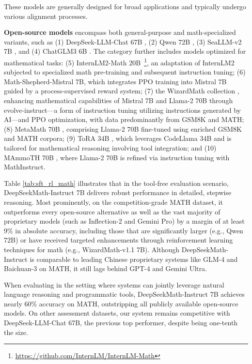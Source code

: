These models are generally designed for broad applications and typically undergo various alignment processes.
\item \textbf{Open-source models} encompass both general-purpose and math-specialized variants, such as (1) DeepSeek-LLM-Chat 67B \citep{deepseek-llm}, (2) Qwen 72B \citep{qwen}, (3) SeaLLM-v2 7B \citep{seallm}, and (4) ChatGLM3 6B \citep{chatglm3}. The category further includes models optimized for mathematical tasks: (5) InternLM2-Math 20B~\footnote{\url{https://github.com/InternLM/InternLM-Math}}, an adaptation of InternLM2 subjected to specialized math pre-training and subsequent instruction tuning; (6) Math-Shepherd-Mistral 7B, which integrates PPO training \citep{schulman2017proximal} into Mistral 7B \citep{mistral} guided by a process-supervised reward system; (7) the WizardMath collection \citep{wizardmath}, enhancing mathematical capabilities of Mistral 7B and Llama-2 70B \citep{llama2} through evolve-instruct—a form of instruction tuning utilizing instructions generated by AI—and PPO optimization, with data predominantly from GSM8K and MATH; (8) MetaMath 70B \citep{metamath}, comprising Llama-2 70B fine-tuned using enriched GSM8K and MATH corpora; (9) ToRA 34B \cite{tora}, which leverages CodeLlama 34B and is tailored for mathematical reasoning involving tool integration; and (10) MAmmoTH 70B \citep{MathInstruct}, where Llama-2 70B is refined via instruction tuning with MathInstruct.

Table \ref{tab:sft_rl_math} illustrates that in the tool-free evaluation scenario, DeepSeekMath-Instruct 7B delivers robust performance in detailed, stepwise reasoning. Most prominently, on the competition-grade MATH dataset, it outperforms every open-source alternative as well as the vast majority of proprietary models (such as Inflection-2 and Gemini Pro) by a margin of at least 9\% in absolute accuracy, including those that are significantly larger (e.g., Qwen 72B) or have received targeted enhancements through reinforcement learning techniques for math (e.g., WizardMath-v1.1 7B). Although DeepSeekMath-Instruct is comparable to leading Chinese proprietary systems like GLM-4 and Baichuan-3 on MATH, it still lags behind GPT-4 and Gemini Ultra.

When evaluating in the setting where systems can jointly leverage natural language reasoning and programmatic tools, DeepSeekMath-Instruct 7B achieves nearly 60\% accuracy on MATH, outstripping all publicly available open-source models. On other assessment datasets, our system remains competitive with DeepSeek-LLM-Chat 67B, the previous top performer, despite being one-tenth the size.
